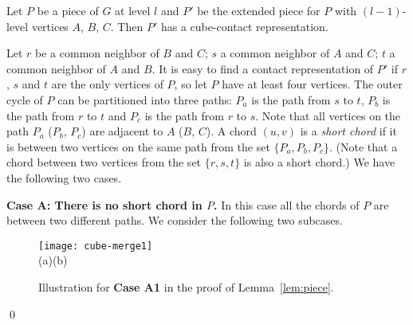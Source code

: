 \documentclass{llncs}
\renewenvironment{proof}{\medskip\noindent{\bf Proof:}}{\mbox{}\hfill\qed\par}
\begin{document}
\begin{lemma}
	\label{lem:piece} Let $P$ be a piece of $G$ at level $l$ and $P'$ be the
	extended piece for $P$ with $(l-1)$-level vertices $A$, $B$, $C$. Then $P'$ has a
	cube-contact representation.
\end{lemma}
\begin{proof} Let $r$ be a common neighbor of $B$ and $C$; $s$ a common neighbor of $A$
 and $C$; $t$ a common neighbor of $A$ and $B$. It is easy to find a contact
 representation of $P'$ if $r$, $s$ and $t$ are the only vertices of
 $P$, so let
 $P$ have at least four vertices. The outer cycle of $P$ can be
 partitioned into three paths: $P_a$ is the path from $s$ to $t$, $P_b$ is the path from $r$ to
 $t$ and $P_c$ is the path from $r$ to $s$. Note that all vertices on the path $P_a$ ($P_b$,
 $P_c$) are adjacent to $A$ ($B$, $C$). A chord $(u,v)$ is a \textit{short chord} if it is between
 two vertices on the same path from the set $\{P_a, P_b, P_c\}$. (Note that a chord between two
 vertices from the set $\{r,s,t\}$ is also a short chord.) We have the following two cases.

\smallskip\noindent
\textbf{Case A: There is no short chord in $P$.} In this case all the chords of $P$ are between two
 different paths. We consider the following two subcases.




\begin{figure}[tb]
\centering
	\texttt{[image: cube-merge1]}\\
	(a)\hspace{0.38\textwidth}(b)\hspace{0.05\textwidth}
	\caption{Illustration for \textbf{Case A1} in the proof of Lemma~\ref{lem:piece}.}
	\label{fig:cube-merge1}
\end{figure}



\end{proof}
\end{document}
